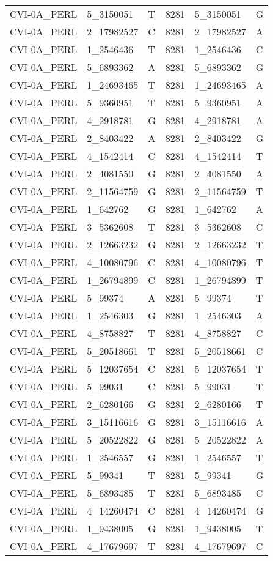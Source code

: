 \begin{center}
\begin{longtable}{|l|l|l|l|l|l|}
CVI-0A\_PERL&5\_3150051&T&8281&5\_3150051&G\\
CVI-0A\_PERL&2\_17982527&C&8281&2\_17982527&A\\
CVI-0A\_PERL&1\_2546436&T&8281&1\_2546436&C\\
CVI-0A\_PERL&5\_6893362&A&8281&5\_6893362&G\\
CVI-0A\_PERL&1\_24693465&T&8281&1\_24693465&A\\
CVI-0A\_PERL&5\_9360951&T&8281&5\_9360951&A\\
CVI-0A\_PERL&4\_2918781&G&8281&4\_2918781&A\\
CVI-0A\_PERL&2\_8403422&A&8281&2\_8403422&G\\
CVI-0A\_PERL&4\_1542414&C&8281&4\_1542414&T\\
CVI-0A\_PERL&2\_4081550&G&8281&2\_4081550&A\\
CVI-0A\_PERL&2\_11564759&G&8281&2\_11564759&T\\
CVI-0A\_PERL&1\_642762&G&8281&1\_642762&A\\
CVI-0A\_PERL&3\_5362608&T&8281&3\_5362608&C\\
CVI-0A\_PERL&2\_12663232&G&8281&2\_12663232&T\\
CVI-0A\_PERL&4\_10080796&C&8281&4\_10080796&T\\
CVI-0A\_PERL&1\_26794899&C&8281&1\_26794899&T\\
CVI-0A\_PERL&5\_99374&A&8281&5\_99374&T\\
CVI-0A\_PERL&1\_2546303&G&8281&1\_2546303&A\\
CVI-0A\_PERL&4\_8758827&T&8281&4\_8758827&C\\
CVI-0A\_PERL&5\_20518661&T&8281&5\_20518661&C\\
CVI-0A\_PERL&5\_12037654&C&8281&5\_12037654&T\\
CVI-0A\_PERL&5\_99031&C&8281&5\_99031&T\\
CVI-0A\_PERL&2\_6280166&G&8281&2\_6280166&T\\
CVI-0A\_PERL&3\_15116616&G&8281&3\_15116616&A\\
CVI-0A\_PERL&5\_20522822&G&8281&5\_20522822&A\\
CVI-0A\_PERL&1\_2546557&G&8281&1\_2546557&T\\
CVI-0A\_PERL&5\_99341&T&8281&5\_99341&G\\
CVI-0A\_PERL&5\_6893485&T&8281&5\_6893485&C\\
CVI-0A\_PERL&4\_14260474&C&8281&4\_14260474&G\\
CVI-0A\_PERL&1\_9438005&G&8281&1\_9438005&T\\
CVI-0A\_PERL&4\_17679697&T&8281&4\_17679697&C\\

\end{longtable}
\end{center}
